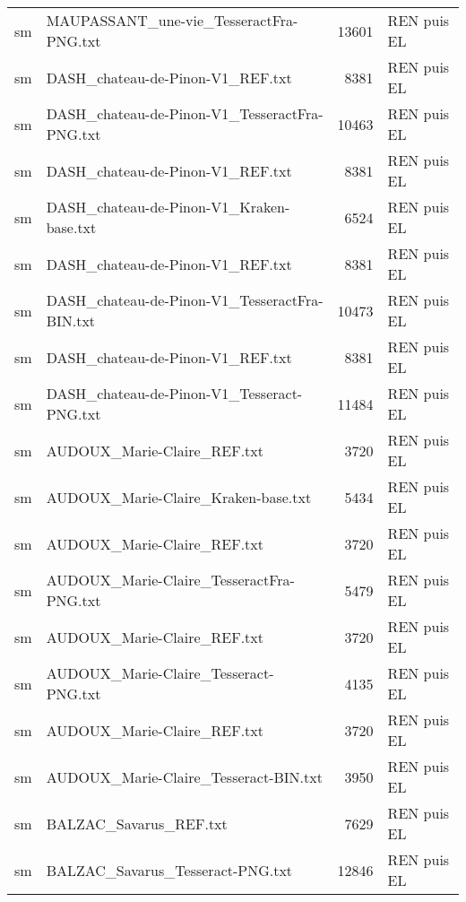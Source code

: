 \begin{tabular}{llrl}
    sm &            MAUPASSANT\_une-vie\_TesseractFra-PNG.txt &                 13601 & REN puis EL \\
    sm &                   DASH\_chateau-de-Pinon-V1\_REF.txt &                  8381 & REN puis EL \\
    sm &      DASH\_chateau-de-Pinon-V1\_TesseractFra-PNG.txt &                 10463 & REN puis EL \\
    sm &                   DASH\_chateau-de-Pinon-V1\_REF.txt &                  8381 & REN puis EL \\
    sm &           DASH\_chateau-de-Pinon-V1\_Kraken-base.txt &                  6524 & REN puis EL \\
    sm &                   DASH\_chateau-de-Pinon-V1\_REF.txt &                  8381 & REN puis EL \\
    sm &      DASH\_chateau-de-Pinon-V1\_TesseractFra-BIN.txt &                 10473 & REN puis EL \\
    sm &                   DASH\_chateau-de-Pinon-V1\_REF.txt &                  8381 & REN puis EL \\
    sm &         DASH\_chateau-de-Pinon-V1\_Tesseract-PNG.txt &                 11484 & REN puis EL \\
    sm &                        AUDOUX\_Marie-Claire\_REF.txt &                  3720 & REN puis EL \\
    sm &                AUDOUX\_Marie-Claire\_Kraken-base.txt &                  5434 & REN puis EL \\
    sm &                        AUDOUX\_Marie-Claire\_REF.txt &                  3720 & REN puis EL \\
    sm &           AUDOUX\_Marie-Claire\_TesseractFra-PNG.txt &                  5479 & REN puis EL \\
    sm &                        AUDOUX\_Marie-Claire\_REF.txt &                  3720 & REN puis EL \\
    sm &              AUDOUX\_Marie-Claire\_Tesseract-PNG.txt &                  4135 & REN puis EL \\
    sm &                        AUDOUX\_Marie-Claire\_REF.txt &                  3720 & REN puis EL \\
    sm &              AUDOUX\_Marie-Claire\_Tesseract-BIN.txt &                  3950 & REN puis EL \\
    sm &                             BALZAC\_Savarus\_REF.txt &                  7629 & REN puis EL \\
    sm &                   BALZAC\_Savarus\_Tesseract-PNG.txt &                 12846 & REN puis EL \\

\end{tabular}
